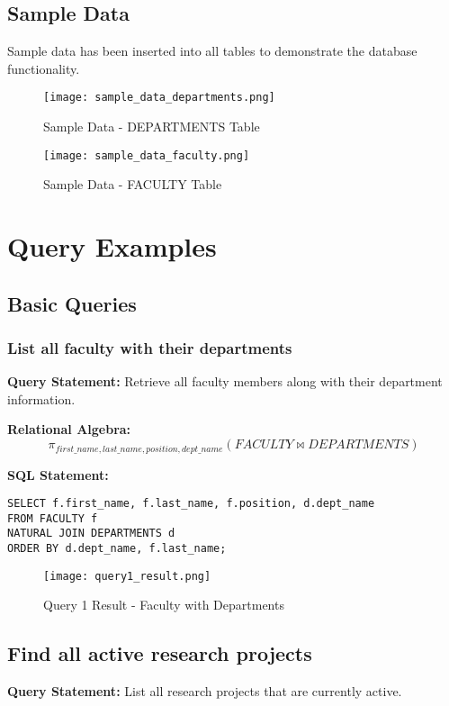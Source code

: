\documentclass[12pt,a4paper]{article}
\begin{document}
\subsection{Sample Data}
Sample data has been inserted into all tables to demonstrate the database functionality.

\begin{figure}[H]
    \centering
    \texttt{[image: sample\_data\_departments.png]}
    \caption{Sample Data - DEPARTMENTS Table}
\end{figure}

\begin{figure}[H]
    \centering
    \texttt{[image: sample\_data\_faculty.png]}
    \caption{Sample Data - FACULTY Table}
\end{figure}

\section{Query Examples}

\subsection{Basic Queries}

\subsubsection{List all faculty with their departments}
\textbf{Query Statement:} Retrieve all faculty members along with their department information.

\textbf{Relational Algebra:}
$$\pi_{first\_name, last\_name, position, dept\_name}(FACULTY \bowtie DEPARTMENTS)$$

\textbf{SQL Statement:}
\begin{lstlisting}[style=sqlstyle]
SELECT f.first_name, f.last_name, f.position, d.dept_name
FROM FACULTY f
NATURAL JOIN DEPARTMENTS d
ORDER BY d.dept_name, f.last_name;
\end{lstlisting}

\begin{figure}[H]
    \centering
    \texttt{[image: query1\_result.png]}
    \caption{Query 1 Result - Faculty with Departments}
\end{figure}

\subsection{Find all active research projects}
\textbf{Query Statement:} List all research projects that are currently active.
\end{document}
